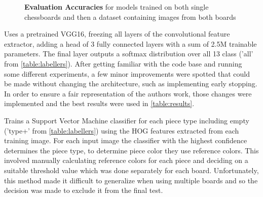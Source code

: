 \begin{figure}[h]
\caption{\textbf{Evaluation Accuracies} for models trained on both single chessboards and then a dataset containing images from both boards}
\label{table:results}
\end{figure}

\cite{} Uses a pretrained VGG16, freezing all layers of the convolutional feature extractor, adding a head of 3 fully connected layers with a sum of 2.5M 
trainable parameters.
The final layer outputs a softmax distribution over all 13 class ('all' from \autoref{table:labellers}).  After getting familiar with the code base and running some 
different experiments, a few minor improvements were spotted that could be made without changing the architecture, such as implementing early stopping. 
In order to ensure a fair representation of the authors work, those changes were implemented and the best results were used in \autoref{table:results}.

\cite{} Trains a Support Vector Machine classifier for each piece type including empty ('type+' from \autoref{table:labellers}) using the HOG features extracted 
from each training image.  For each input image the classifier with the highest confidence determines the piece type, to determine piece color they use reference colors.
This involved manually calculating reference colors for each piece and deciding on a suitable threshold value which was done separately for each board.  Unfortunately,
this method made it difficult to generalize when using multiple boards and so the decision was made to exclude it from the final test.


